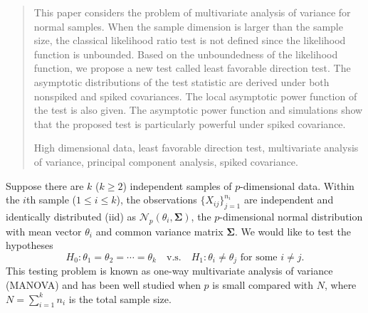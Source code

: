 \documentclass[12pt]{article} %
\renewcommand{\theequation}{\thesection\arabic{equation}}
\newcommand{\bfsym}[1]{\ensuremath{\boldsymbol{#1}}}
\def\bSigma {\bfsym {\Sigma}}
\theoremstyle{definition}
\begin{document}
\begin{quotation}
This paper considers the problem of multivariate analysis of variance for normal samples.
    When the sample dimension is larger than the sample size, the classical likelihood ratio test is not defined since the likelihood function is unbounded.
    Based on the unboundedness of the likelihood function, we propose a new test called least favorable direction test.
    The asymptotic distributions of the test statistic are derived under both nonspiked and spiked covariances.
    The local asymptotic power function of the test is also given.
    The asymptotic power function and simulations show that the proposed test is particularly powerful under spiked covariance.

\vspace{9pt}
    High dimensional data, least favorable direction test, multivariate analysis of variance, principal component analysis, spiked covariance.
\par
\end{quotation}\par



\def\thefigure{\arabic{figure}}
\def\thetable{\arabic{table}}

\renewcommand{\theequation}{\thesection.\arabic{equation}}


\fontsize{12}{14pt plus.8pt minus .6pt}\selectfont

\setcounter{section}{1} %
\setcounter{equation}{0} %

Suppose there are $k$ ($k\geq 2$) independent samples of $p$-dimensional data.
Within the $i$th sample ($1\leq i\leq k$), the observations $\{X_{ij}\}_{j=1}^{n_i}$ are independent and identically distributed (iid) as $\mathcal{N}_p(\theta_i,\bSigma)$, the $p$-dimensional normal distribution with mean vector $\theta_i$ and common variance matrix $\bSigma$.
We would like to test the hypotheses
\begin{equation}\label{hypothesis}
    H_0: \theta_1=\theta_2=\cdots=\theta_k\quad \text{v.s.}\quad　H_1: \text{$\theta_i\neq \theta_j$ for some $i\neq j$}.
\end{equation}
This testing problem is known as one-way multivariate analysis of variance (MANOVA) and has been well studied when $p$ is small compared with $N$, where $N=\sum_{i=1}^k n_i$ is the total sample size.
\end{document}
